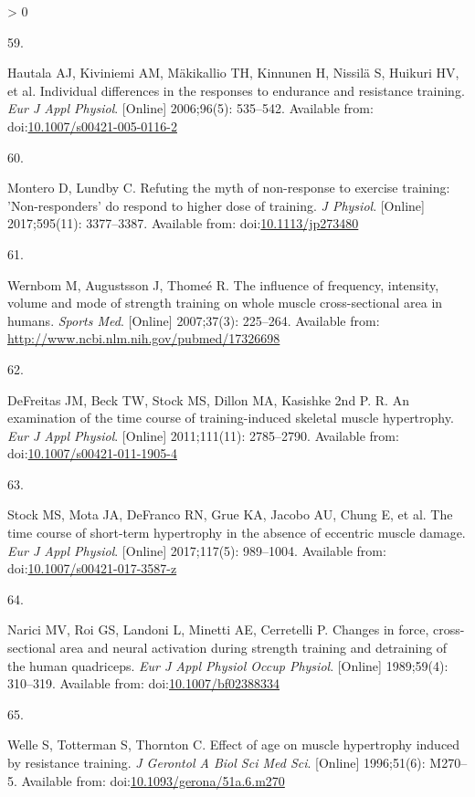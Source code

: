 \documentclass[twoside,10pt]{gihclass} %
\newlength{\cslhangindent}
\newlength{\csllabelwidth}
\newenvironment{CSLReferences}[3] %
 {%
  \setlength{\parindent}{0pt}
  \ifodd #1 \everypar{\setlength{\hangindent}{\cslhangindent}}\ignorespaces\fi
  \ifnum #2 > 0
  \setlength{\parskip}{#2\baselineskip}
  \fi
 }%
 {}
\newcommand{\CSLLeftMargin}[1]{\parbox[t]{\maxof{\widthof{#1}}{\csllabelwidth}}{#1}}
\newcommand{\CSLRightInline}[1]{\parbox[t]{\linewidth}{#1}}
\begin{document}
\begin{CSLReferences}{0}{0}
\leavevmode\hypertarget{ref-RN2681}{}%
\CSLLeftMargin{59. }
\CSLRightInline{Hautala AJ, Kiviniemi AM, Mäkikallio TH, Kinnunen H, Nissilä S, Huikuri HV, et al. Individual differences in the responses to endurance and resistance training. \emph{Eur J Appl Physiol}. {[}Online{]} 2006;96(5): 535--542. Available from: doi:\href{https://doi.org/10.1007/s00421-005-0116-2}{10.1007/s00421-005-0116-2}}

\leavevmode\hypertarget{ref-RN2699}{}%
\CSLLeftMargin{60. }
\CSLRightInline{Montero D, Lundby C. Refuting the myth of non-response to exercise training: 'Non-responders' do respond to higher dose of training. \emph{J Physiol}. {[}Online{]} 2017;595(11): 3377--3387. Available from: doi:\href{https://doi.org/10.1113/jp273480}{10.1113/jp273480}}

\leavevmode\hypertarget{ref-RN346}{}%
\CSLLeftMargin{61. }
\CSLRightInline{Wernbom M, Augustsson J, Thomeé R. The influence of frequency, intensity, volume and mode of strength training on whole muscle cross-sectional area in humans. \emph{Sports Med}. {[}Online{]} 2007;37(3): 225--264. Available from: \url{http://www.ncbi.nlm.nih.gov/pubmed/17326698}}

\leavevmode\hypertarget{ref-RN1596}{}%
\CSLLeftMargin{62. }
\CSLRightInline{DeFreitas JM, Beck TW, Stock MS, Dillon MA, Kasishke 2nd P. R. An examination of the time course of training-induced skeletal muscle hypertrophy. \emph{Eur J Appl Physiol}. {[}Online{]} 2011;111(11): 2785--2790. Available from: doi:\href{https://doi.org/10.1007/s00421-011-1905-4}{10.1007/s00421-011-1905-4}}

\leavevmode\hypertarget{ref-RN2113}{}%
\CSLLeftMargin{63. }
\CSLRightInline{Stock MS, Mota JA, DeFranco RN, Grue KA, Jacobo AU, Chung E, et al. The time course of short-term hypertrophy in the absence of eccentric muscle damage. \emph{Eur J Appl Physiol}. {[}Online{]} 2017;117(5): 989--1004. Available from: doi:\href{https://doi.org/10.1007/s00421-017-3587-z}{10.1007/s00421-017-3587-z}}

\leavevmode\hypertarget{ref-RN2736}{}%
\CSLLeftMargin{64. }
\CSLRightInline{Narici MV, Roi GS, Landoni L, Minetti AE, Cerretelli P. Changes in force, cross-sectional area and neural activation during strength training and detraining of the human quadriceps. \emph{Eur J Appl Physiol Occup Physiol}. {[}Online{]} 1989;59(4): 310--319. Available from: doi:\href{https://doi.org/10.1007/bf02388334}{10.1007/bf02388334}}

\leavevmode\hypertarget{ref-RN2739}{}%
\CSLLeftMargin{65. }
\CSLRightInline{Welle S, Totterman S, Thornton C. Effect of age on muscle hypertrophy induced by resistance training. \emph{J Gerontol A Biol Sci Med Sci}. {[}Online{]} 1996;51(6): M270--5. Available from: doi:\href{https://doi.org/10.1093/gerona/51a.6.m270}{10.1093/gerona/51a.6.m270}}


\end{CSLReferences}
\end{document}
